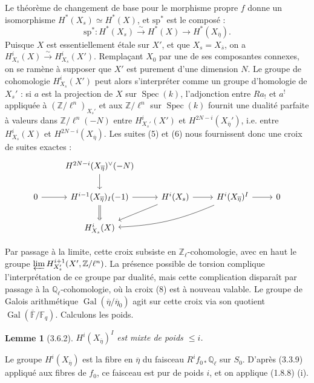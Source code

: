 \documentclass[12pt,a4paper]{article}
\theoremstyle{plain}
\newtheorem{lemma}[theorem]{Lemme}
\theoremstyle{definition}
\theoremstyle{remark}
\DeclareMathOperator{\Gal}{Gal}
\DeclareMathOperator{\Spec}{Spec}
\newcommand{\FF}{{\mathbb{F}}}
\newcommand{\QQ}{{\mathbb{Q}}}
\newcommand{\ZZ}{{\mathbb{Z}}}
\begin{document}
Le th\'eor\`eme de changement de base pour le morphisme propre $f$ donne un isomorphisme $H^*(X_s) \simeq H^*(X)$, et $\mathrm{sp}^*$ est le compos\'e :
\begin{equation}\label{eq:3.6.1.7}
\mathrm{sp}^* : H^*(X_s) \xrightarrow{\sim} H^*(X) \to H^*(X_{\overline{\eta}}).
\end{equation}
Puisque $X$ est essentiellement \'etale sur $X'$, et que $X_s = X_{\overline{s}}$, on a $H_{X_s}^i(X) \xrightarrow{\sim} H_{X_s}^i(X')$. Rempla\c{c}ant $X_0$ par une de ses composantes connexes, on se ram\`ene \`a supposer que $X'$ est purement d'une dimension $N$. Le groupe de cohomologie $H_{X_s}^i(X')$ peut alors s'interpr\'eter comme un groupe d'homologie de $X_s'$ : si $a$ est la projection de $X$ sur $\Spec(k)$, l'adjonction entre $Ra_!$ et $a^!$ appliqu\'ee \`a $(\ZZ/\ell^n)_{X_s'}$ et aux $\ZZ/\ell^n$ sur $\Spec(k)$ fournit une dualit\'e parfaite \`a valeurs dans $\ZZ/\ell^n(-N)$ entre $H_{X_s'}^i(X')$ et $H^{2N-i}(X_{\overline{\eta}}')$, i.e. entre $H_{X_s}^i(X)$ et $H^{2N-i}(X_{\overline{\eta}})$. Les suites (5) et (6) nous fournissent donc une croix de suites exactes :
\begin{equation}\label{eq:3.6.1.8}
\begin{tikzcd}
& H^{2N-i}(X_{\overline{\eta}})^\vee(-N) \arrow[d] \\
0 \arrow[r] & H^{i-1}(X_{\overline{\eta}})_I(-1) \arrow[r] \arrow[d] & H^i(X_s) \arrow[r] \arrow[dl] & H^i(X_{\overline{\eta}})^I \arrow[r] \arrow[dll, bend left=10] & 0 \\
& H_{X_s}^i(X) \arrow[u, equal] & &
\end{tikzcd}
\end{equation}

Par passage \`a la limite, cette croix subsiste en $\ZZ_\ell$-cohomologie, avec en haut le groupe $\varprojlim H_{X_s'}^{i+1}(X', \ZZ/\ell^n)$. La pr\'esence possible de torsion complique l'interpr\'etation de ce groupe par dualit\'e, mais cette complication dispara\^it par passage \`a la $\QQ_\ell$-cohomologie, o\`u la croix (8) est \`a nouveau valable. Le groupe de Galois arithm\'etique $\Gal(\overline{\eta}/\overline{\eta}_0)$ agit sur cette croix via son quotient $\Gal(\overline{\FF}/\FF_q)$. Calculons les poids.

\begin{lemma}[3.6.2]
$H^i(X_{\overline{\eta}})^I$ est mixte de poids $\leq i$.
\end{lemma}

Le groupe $H^i(X_{\overline{\eta}})$ est la fibre en $\overline{\eta}$ du faisceau $R^i f_{0*} \QQ_\ell$ sur $S_0$. D'apr\`es (3.3.9) appliqu\'e aux fibres de $f_0$, ce faisceau est pur de poids $i$, et on applique (1.8.8) (i).
\end{document}
